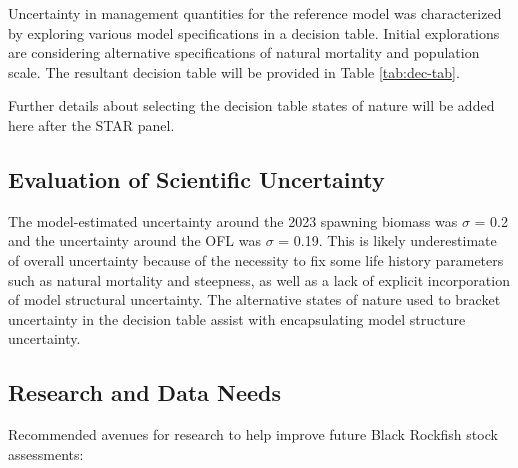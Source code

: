 \documentclass[11pt,
  english,
  letterpaper,
]{article}
\begin{document}
Uncertainty in management quantities for the reference model was characterized by exploring various model specifications in a decision table. Initial explorations are considering alternative specifications of natural mortality and population scale. The resultant decision table will be provided in Table \ref{tab:dec-tab}.

Further details about selecting the decision table states of nature will be added here after the STAR panel.

\hypertarget{evaluation-of-scientific-uncertainty}{%
\subsection{Evaluation of Scientific Uncertainty}\label{evaluation-of-scientific-uncertainty}}

The model-estimated uncertainty around the 2023 spawning biomass was \(\sigma\) = 0.2 and the uncertainty around the OFL was \(\sigma\) = 0.19. This is likely underestimate of overall uncertainty because of the necessity to fix some life history parameters such as natural mortality and steepness, as well as a lack of explicit incorporation of model structural uncertainty. The alternative states of nature used to bracket uncertainty in the decision table assist with encapsulating model structure uncertainty.

\hypertarget{research-and-data-needs-1}{%
\subsection{Research and Data Needs}\label{research-and-data-needs-1}}

Recommended avenues for research to help improve future Black Rockfish stock assessments:
\end{document}
